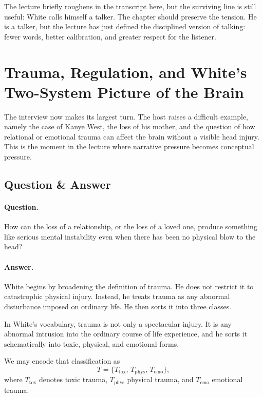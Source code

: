 The lecture briefly roughens in the transcript here, but the surviving line is still useful: White calls himself a talker. The chapter should preserve the tension. He is a talker, but the lecture has just defined the disciplined version of talking: fewer words, better calibration, and greater respect for the listener.

\section{Trauma, Regulation, and White's Two-System Picture of the Brain}

The interview now makes its largest turn. The host raises a difficult example, namely the case of Kanye West, the loss of his mother, and the question of how relational or emotional trauma can affect the brain without a visible head injury. This is the moment in the lecture where narrative pressure becomes conceptual pressure.

\subsection{Question \& Answer}

\paragraph{Question.} How can the loss of a relationship, or the loss of a loved one, produce something like serious mental instability even when there has been no physical blow to the head?

\paragraph{Answer.} White begins by broadening the definition of trauma. He does not restrict it to catastrophic physical injury. Instead, he treats trauma as any abnormal disturbance imposed on ordinary life. He then sorts it into three classes.

\begin{definition}
In White's vocabulary, trauma is not only a spectacular injury. It is any abnormal intrusion into the ordinary course of life experience, and he sorts it schematically into toxic, physical, and emotional forms.
\end{definition}

We may encode that classification as
\begin{equation}
T=\{T_{\mathrm{tox}},\,T_{\mathrm{phys}},\,T_{\mathrm{emo}}\},
\end{equation}
where \(T_{\mathrm{tox}}\) denotes toxic trauma, \(T_{\mathrm{phys}}\) physical trauma, and \(T_{\mathrm{emo}}\) emotional trauma.

